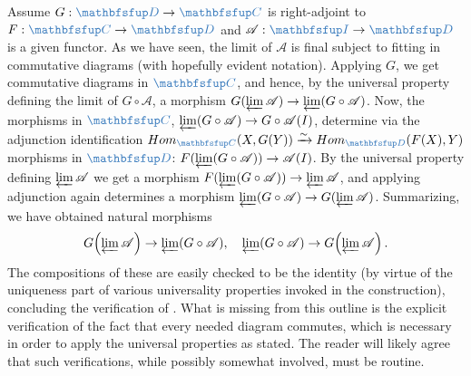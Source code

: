 Assume $G : \categ{D} \to \categ{C}$ is right-adjoint to
$F : \categ{C} \to \categ{D}$ and
$\mathscr{A} : \categ{I} \to \categ{D}$ is a given functor. As we have
seen, the limit of $\mathscr{A}$ is final subject to fitting in
commutative diagrams (with hopefully evident notation). Applying $G$,
we get commutative diagrams in $\categ{C}$, and hence, by the
universal property defining the limit of $G \circ \mathscr{A}$, a
morphism
$G(\varprojlim \mathscr{A}) \to \varprojlim(G \circ \mathscr{A})$.
Now, the morphisms in $\categ{C}$,
$\varprojlim(G \circ \mathscr{A}) \to G \circ \mathscr{A}(I)$,
determine via the adjunction identification
$\Hom_{\categ{C}}(X, G(Y)) \xrightarrow{\sim} \Hom_{\categ{D}}(F(X),
Y)$ morphisms in $\categ{D}$:
$F(\varprojlim(G \circ \mathscr{A})) \to \mathscr{A}(I)$.  By the
universal property defining $\varprojlim \mathscr{A}$ we get a
morphism
$F(\varprojlim(G \circ \mathscr{A})) \to \varprojlim \mathscr{A}$, and
applying adjunction again determines a morphism
$\varprojlim(G \circ \mathscr{A}) \to G(\varprojlim \mathscr{A})$.
Summarizing, we have obtained natural morphisms
\[
  G\!\left(\varprojlim \mathscr{A}\right) \to \varprojlim(G \circ
  \mathscr{A}), \quad \varprojlim(G \circ \mathscr{A}) \to
  G\!\left(\varprojlim \mathscr{A}\right).
\]
The compositions of these are easily checked to be the identity (by
virtue of the uniqueness part of various universality properties
invoked in the construction), concluding the verification of
. What is missing
from this outline is the explicit
verification of the fact that every needed diagram commutes, which is
necessary in order to apply the universal properties as stated. The
reader will likely agree that such verifications, while possibly
somewhat involved, must be routine.


